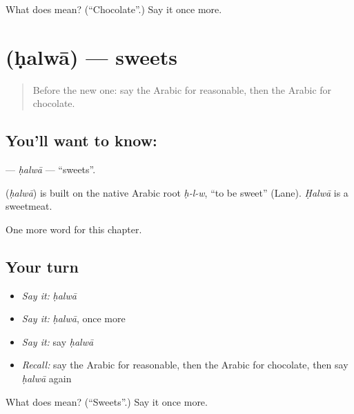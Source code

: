 \begin{tcolorbox}[breakable,colback=teal!4,colframe=teal!35!black,title={Before you move on}]
What does  mean? (\textquotedblleft{}Chocolate\textquotedblright{}.) Say it once more.
\end{tcolorbox}
\section[\texorpdfstring{\ar{حلوى} (ḥalwā)}{حلوى (ḥalwā)}]{ (ḥalwā) — sweets}

\label{lesson:AR-C273-halwa}



\begin{quote}
Before the new one: say the Arabic for reasonable, then the Arabic for chocolate.
\end{quote}

\subsection*{You'll want to know: }
\textbf{} — \emph{ḥalwā} — \textquotedblleft{}sweets\textquotedblright{}.

\begin{cousinweb}
\textbf{} (\emph{ḥalwā}) is built on the native Arabic root \emph{ḥ-l-w}, \textquotedblleft{}to be sweet\textquotedblright{} (Lane). \emph{Ḥalwā} is a sweetmeat.
\end{cousinweb}

\begin{grammarlens}[title={What you've built}]
One more word for this chapter.
\end{grammarlens}

\subsection*{Your turn}
\begin{itemize}
\raggedright
  \item \emph{Say it:} \emph{ḥalwā}
  \item \emph{Say it:} \emph{ḥalwā}, once more
  \item \emph{Say it:} say \emph{ḥalwā}
  \item \emph{Recall:} say the Arabic for reasonable, then the Arabic for chocolate, then say \emph{ḥalwā} again
\end{itemize}

\begin{tcolorbox}[breakable,colback=teal!4,colframe=teal!35!black,title={Before you move on}]
What does  mean? (\textquotedblleft{}Sweets\textquotedblright{}.) Say it once more.
\end{tcolorbox}
